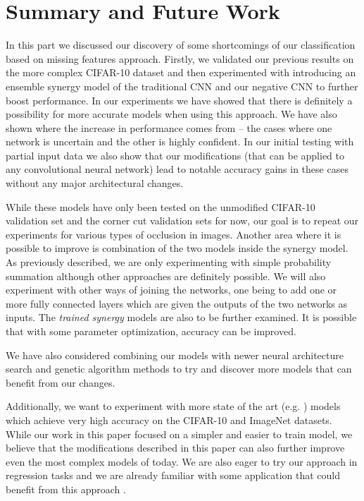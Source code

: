 \documentclass[b5paper]{book}
\let\cite\parencite
\begin{document}
\section{Summary and Future Work}
\label{summary}

In this part we discussed our discovery of some shortcomings of our classification based on missing features approach. Firstly, we validated our previous results on the more complex CIFAR-10 dataset and then experimented with introducing an ensemble synergy model of the traditional CNN and our negative CNN to further boost performance. In our experiments we have showed that there is definitely a possibility for more accurate models when using this approach. We have also shown where the increase in performance comes from -- the cases where one network is uncertain and the other is highly confident. In our initial testing with partial input data we also show that our modifications (that can be applied to any convolutional neural network) lead to notable accuracy gains in these cases without any major architectural changes.

While these models have only been tested on the unmodified CIFAR-10 validation set and the corner cut validation sets for now, our goal is to repeat our experiments for various types of occlusion in images. Another area where it is possible to improve is combination of the two models inside the synergy model. As previously described, we are only experimenting with simple probability summation although other approaches are definitely possible. We will also experiment with other ways of joining the networks, one being to add one or more fully connected layers which are given the outputs of the two networks as inputs. The \emph{trained synergy} models are also to be further examined. It is possible that with some parameter optimization, accuracy can be improved.

We have also considered combining our models with newer neural architecture search \cite{elsken2018neural} and genetic algorithm methods \cite{assunccao2019fast} to try and discover more models that can benefit from our changes.

Additionally, we want to experiment with more state of the art (e.g. \cite{he2016deep,huang2017densely,xie2017aggregated}) models which achieve very high accuracy on the CIFAR-10 and ImageNet \cite{deng2009imagenet} datasets. While our work in this paper focused on a simpler and easier to train model, we believe that the modifications described in this paper can also further improve even the most complex models of today. We are also eager to try our approach in regression tasks and we are already familiar with some application that could benefit from this approach \cite{pecev2016system,pecev2017ltr}.
\end{document}
